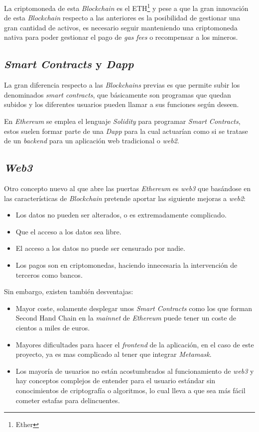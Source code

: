 La criptomoneda de esta \textit{Blockchain} es el ETH\footnote{Ether} y pese a que la gran innovación de esta \textit{Blockchain} respecto a las anteriores es la posibilidad de gestionar una gran cantidad de activos, es necesario seguir manteniendo una criptomoneda nativa para poder gestionar el pago de \textit{gas fees} o recompensar a los mineros.


\subsection{\textit{Smart Contracts} y \textit{Dapp}}
La gran diferencia respecto a las \textit{Blockchains} previas es que permite subir los denominados \textit{smart contracts}, que básicamente son programas que quedan subidos y los diferentes usuarios pueden llamar a sus funciones según deseen.

En \textit{Ethereum} se emplea el lenguaje \textit{Solidity} para programar \textit{Smart Contracts}, estos suelen formar parte de una \textit{Dapp} para la cual actuarían como si se tratase de un \textit{backend} para un aplicación web tradicional o \textit{web2}.

\subsection{\textit{Web3}}
Otro concepto nuevo al que abre las puertas \textit{Ethereum} es \textit{web3}\cite{ethereumWeb2Web3} que basándose en las características de \textit{Blockchain} pretende aportar las siguiente mejoras a \textit{web2}:
\begin{itemize}
    \item Los datos no pueden ser alterados, o es extremadamente complicado.
    \item Que el acceso a los datos sea libre.
    \item El acceso a los datos no puede ser censurado por nadie.
    \item Los pagos son en criptomonedas, haciendo innecesaria la intervención de terceros como bancos.
\end{itemize}

Sin embargo, existen también desventajas:
\begin{itemize}
    \item Mayor coste, solamente desplegar unos \textit{Smart Contracts} como los que forman Second Hand Chain en la \textit{mainnet} de \textit{Ethereum} puede tener un coste de cientos a miles de euros.
    \item Mayores dificultades para hacer el \textit{frontend} de la aplicación, en el caso de este proyecto, ya es mas complicado al tener que integrar \textit{Metamask}.
    \item Los mayoría de usuarios no están acostumbrados al funcionamiento de \textit{web3} y hay conceptos complejos de entender para el usuario estándar sin conocimientos de criptografía o algoritmos, lo cual lleva a que sea más fácil cometer estafas para delincuentes.
\end{itemize}

